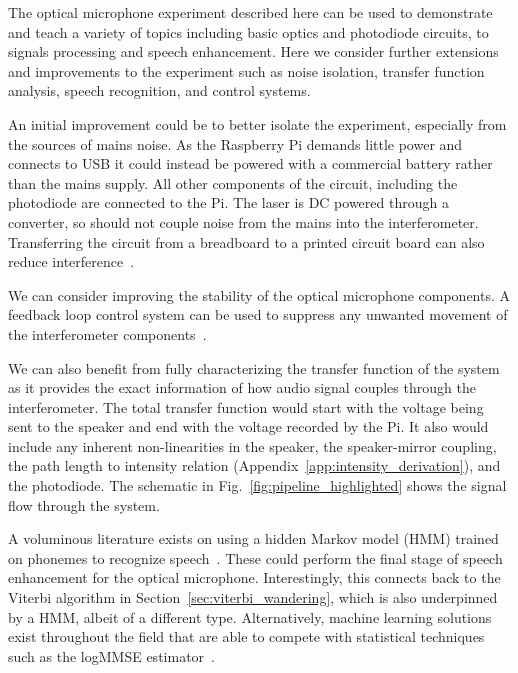 \documentclass[paper-main.tex]{subfiles}
\begin{document}
The optical microphone experiment described here can be used to demonstrate and teach a variety of topics including basic optics and photodiode circuits, to signals processing and speech enhancement. Here we consider further extensions and improvements to the experiment such as noise isolation, transfer function analysis, speech recognition, and control systems.


An initial improvement could be to better isolate the experiment, especially from the sources of mains noise. As the Raspberry Pi demands little power and connects to USB it could instead be powered with a commercial battery rather than the mains supply. All other components of the circuit, including the photodiode are connected to the Pi. The laser is DC powered through a converter, so should not couple noise from the mains into the interferometer. Transferring the circuit from a breadboard to a printed circuit board can also reduce interference~\cite{elfekey2013design}.


We can consider improving the stability of the optical microphone components. A feedback loop control system can be used to suppress any unwanted movement of the interferometer components~\citep{abbott2017exploring, Sekiguchi:2016bmv, verhoeven2009robust}. 


We can also benefit from fully characterizing the transfer function of the system as it provides the exact information of how audio signal couples through the interferometer. The total transfer function would start with the voltage being sent to the speaker and end with the voltage recorded by the Pi. It also would include any inherent non-linearities in the speaker, the speaker-mirror coupling, the path length to intensity relation (Appendix~\ref{app:intensity_derivation}), and the photodiode. The schematic in Fig.~\ref{fig:pipeline_highlighted} shows the signal flow through the system.

A voluminous literature exists on using a hidden Markov model (HMM) trained on phonemes to recognize speech~\cite{HMM_english}. These could perform the final stage of speech enhancement for the optical microphone. Interestingly, this connects back to the Viterbi algorithm in Section~\ref{sec:viterbi_wandering}, which is also underpinned by a HMM, albeit of a different type. Alternatively, machine learning solutions exist throughout the field that are able to compete with statistical techniques such as the logMMSE estimator~\cite{SEGAN}.
\end{document}
